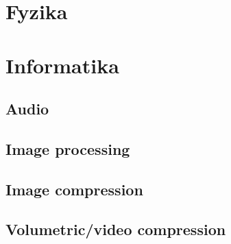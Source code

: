 \section{Fyzika}
    
    
    
    
\section{Informatika}
    
    \subsection{Audio}
    \subsection{Image processing}
    \subsection{Image compression}
    \subsection{Volumetric/video compression}
     
